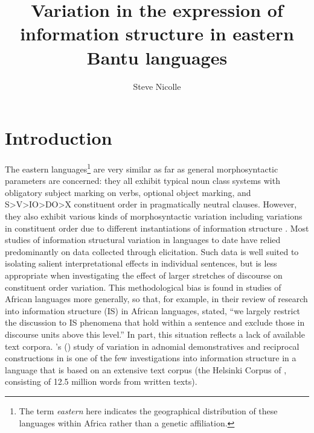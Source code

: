 \documentclass[output=paper]{langsci/langscibook}
\title{Variation in the expression of information structure in eastern {Bantu} languages}
\author{%
Steve Nicolle\affiliation{Canada Institute of Linguistics / SIL International} 
}
\begin{document}
 


\section{Introduction}\label{§1:introduction.nicolle}

The eastern  languages\footnote{The term \textit{eastern} here indicates the geographical distribution of these languages within Africa rather than a genetic affiliation.} are very similar as far as general morphosyntactic parameters are concerned: they all exhibit typical  noun class systems with obligatory subject marking on verbs, optional object marking, and S>V>IO>DO>X constituent order in pragmatically neutral clauses. However, they also exhibit various kinds of morphosyntactic variation \citep{martenetal2007,vanderwalbiberauer2014} including variations in constituent order due to different instantiations of information structure \citep{zerbian2006,buelletal2011,yoneda2011,downinghyman2016}. Most studies of information structural variation in  languages to date have relied predominantly on data collected through elicitation. Such data is well suited to isolating salient interpretational effects in individual sentences, but is less appropriate when investigating the effect of larger stretches of discourse on constituent order variation. This methodological bias is found in studies of African languages more generally, so that, for example, \citet[157]{gueldemannetal2015} in their review of research into information structure (IS) in African languages, stated, “we largely restrict the discussion to IS phenomena that hold within a sentence and exclude those in discourse units above this level.” In part, this situation reflects a lack of available text corpora. \citeauthor{mwamzandi2014}’s (\citeyear{mwamzandi2014}) study of variation in adnomial demonstratives and reciprocal constructions in  is one of the few investigations into information structure in a  language that is based on an extensive text corpus (the Helsinki Corpus of , consisting of 12.5 million words from written  texts).
\end{document}
